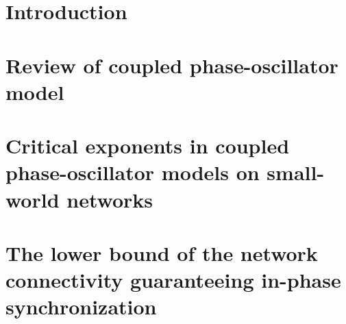 \documentclass[dvipdfmx,12pt,twoside,openright]{book}
\begin{document}


\frontmatter


\tableofcontents
\listoffigures
\listoftables
\listofalgorithms

\mainmatter

\chapter{Introduction}

\printbibliography[segment=\therefsegment,heading=subbibliography]

\chapter{Review of coupled phase-oscillator model}
\label{chap:rev_cpo}

\printbibliography[segment=\therefsegment,heading=subbibliography]
% 
% 

% 

\chapter{Critical exponents in coupled phase-oscillator models on small-world networks}
\label{chap:paper02}

\begin{subappendices}
  
\end{subappendices}
\printbibliography[segment=\therefsegment,heading=subbibliography]
% 
% 

\chapter{The lower bound of the network connectivity guaranteeing in-phase synchronization}
\label{chap:paper03}

\begin{subappendices}
  
\end{subappendices}
\printbibliography[segment=\therefsegment,heading=subbibliography]
% 
% 
\end{document}
